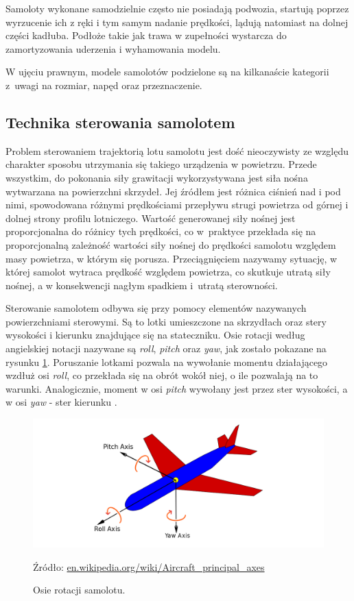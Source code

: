 \documentclass[12pt, a4paper]{article}
\begin{document}
Samoloty wykonane samodzielnie często nie posiadają podwozia, startują poprzez wyrzucenie ich z ręki i tym samym nadanie prędkości, lądują natomiast na dolnej części kadłuba. Podłoże takie jak trawa w zupełności wystarcza do zamortyzowania uderzenia i wyhamowania modelu.
 
W ujęciu prawnym, modele samolotów podzielone są na kilkanaście kategorii z~uwagi na rozmiar, napęd oraz przeznaczenie. 

\subsection{Technika sterowania samolotem}
Problem sterowaniem trajektorią lotu samolotu jest dość nieoczywisty ze względu charakter sposobu utrzymania się takiego urządzenia w powietrzu. Przede wszystkim, do pokonania siły grawitacji wykorzystywana jest siła nośna wytwarzana na powierzchni skrzydeł. Jej źródłem jest różnica ciśnień nad i pod nimi, spowodowana różnymi prędkościami przepływu strugi powietrza od górnej i dolnej strony profilu lotniczego. Wartość generowanej siły nośnej jest proporcjonalna do różnicy tych prędkości, co w~praktyce przekłada się na proporcjonalną zależność wartości siły nośnej do prędkości samolotu względem masy powietrza, w którym się porusza. Przeciągnięciem nazywamy sytuację, w której samolot wytraca prędkość względem powietrza, co skutkuje utratą siły nośnej, a w konsekwencji nagłym spadkiem i~utratą sterowności.

Sterowanie samolotem odbywa się przy pomocy elementów nazywanych powierzchniami sterowymi. Są to lotki umieszczone na skrzydłach oraz stery wysokości i kierunku znajdujące się na stateczniku. Osie rotacji według angielskiej notacji nazywane są \textit{roll}, \textit{pitch} oraz \textit{yaw}, jak zostało pokazane na rysunku \ref{fig:osie}. Poruszanie lotkami pozwala na wywołanie momentu działającego wzdłuż osi \textit{roll}, co przekłada się na obrót wokół niej, o ile pozwalają na to warunki. Analogicznie, moment w osi \textit{pitch} wywołany jest przez ster wysokości, a w osi \textit{yaw} - ster kierunku \cite{mech}.


\begin{figure}[H]
    \centering
    \includegraphics[width=1\textwidth]{osie}
    \caption{Osie rotacji samolotu.}
    \small Źródło: \url{en.wikipedia.org/wiki/Aircraft_principal_axes}
    \label{fig:osie}
\end{figure}
\end{document}
